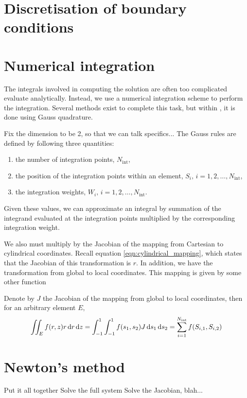 
\section{Discretisation of boundary conditions}

\iffalse 
What are the boundary conditions that we have?
Sommerfeld, Neumann, PML..
How do we discretise these?
\fi





\section{Numerical integration}

The integrals involved in computing the solution are often too complicated evaluate analytically.
Instead, we use a numerical integration scheme to perform the integration.
Several methods exist to complete this task, but within \oomph, it is done using Gauss quadrature.

\cite{oomph}
Fix the dimension to be 2, so that we can talk specifics...
The Gauss rules are defined by following three quantities:
\begin{enumerate}
	\item the number of integration points, $N_\mathrm{int}$,
	\item the position of the integration points within an element, $S_i, \, i=1,2,\ldots,N_\mathrm{int}$,
	\item the integration weights, $W_i, \, i=1,2,\ldots,N_\mathrm{int}$.
\end{enumerate} 
Given these values, we can approximate an integral by summation of the integrand evaluated at the integration points multiplied by the corresponding integration weight.

We also must multiply by the Jacobian of the mapping from Cartesian to cylindrical coordinates.
Recall equation \eqref{eqn:cylindrical_mapping}, which states that the Jacobian of this transformation is $r$.
In addition, we have the transformation from global to local coordinates.
This mapping is given by some other function

Denote by $J$ the Jacobian of the mapping from global to local coordinates, then for an arbitrary element $E$, 
\begin{align}
	\iint_E f(r,z) r \,\mathrm{d} r \,\mathrm{d} z = \int_{-1}^1 \int_{-1}^1  f(s_1, s_2) J \, \mathrm{d} s_1 \, \mathrm{d} s_2 = \sum_{i=1}^{N_\mathrm{int}} f(S_{i,1},S_{i,2}) 
\end{align}










\section{Newton's method}

Put it all together
Solve the full system
Solve the Jacobian, blah...